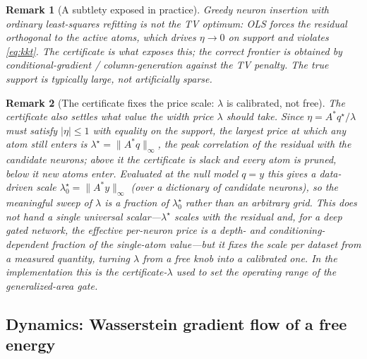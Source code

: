 \documentclass[11pt]{article}
\newtheorem{remark}{Remark}
\theoremstyle{definition}
\begin{document}
\begin{remark}[A subtlety exposed in practice]
Greedy neuron insertion with ordinary least-squares refitting is \emph{not} the TV
optimum: OLS forces the residual orthogonal to the active atoms, which drives $\eta\to0$
on support and violates \eqref{eq:kkt}. The certificate is what exposes this; the correct
frontier is obtained by conditional-gradient / column-generation against the TV penalty.
The true support is typically large, not artificially sparse.
\end{remark}

\begin{remark}[The certificate fixes the price scale: $\lambda$ is calibrated, not free]
The certificate also settles what value the width price $\lambda$ should take. Since $\eta=A^\ast q^\star/\lambda$
must satisfy $|\eta|\le1$ with equality on the support, the largest price at which any atom still enters is
$\lambda^\star=\|A^\ast q\|_\infty$, the peak correlation of the residual with the candidate neurons; above it
the certificate is slack and every atom is pruned, below it new atoms enter. Evaluated at the null model
$q=y$ this gives a data-driven \emph{scale} $\lambda^\star_0=\|A^\ast y\|_\infty$ (over a dictionary of
candidate neurons), so the meaningful sweep of $\lambda$ is a fraction of $\lambda^\star_0$ rather than an
arbitrary grid. This does not hand a single universal scalar---$\lambda^\star$ scales with the residual and,
for a deep gated network, the effective per-neuron price is a depth- and conditioning-dependent fraction of
the single-atom value---but it fixes the \emph{scale} per dataset from a measured quantity, turning $\lambda$
from a free knob into a calibrated one. In the implementation this is the certificate-$\lambda$ used to set
the operating range of the generalized-area gate.
\end{remark}

\subsection{Dynamics: Wasserstein gradient flow of a free energy}
\label{sec:wasserstein}
\end{document}
